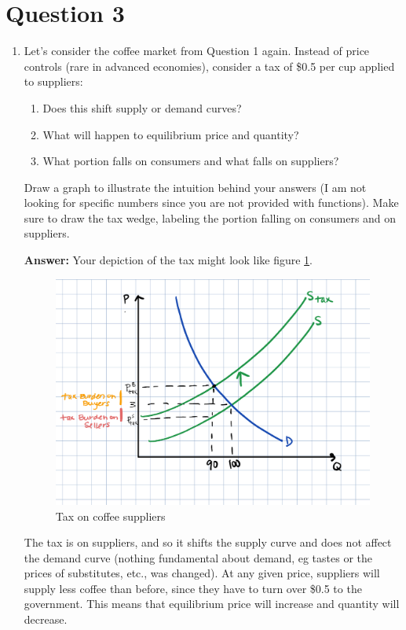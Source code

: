\documentclass[12pt]{article}
\begin{document}
\section*{Question 3}
\begin{enumerate}
\item Let's consider the coffee market from Question 1 again. Instead of price controls (rare in advanced economies), consider a tax of \$0.5 per cup applied to suppliers:

\begin{enumerate}
    \item Does this shift supply or demand curves?
    \item What will happen to equilibrium price and quantity?
    \item What portion falls on consumers and what falls on suppliers?
\end{enumerate}

 Draw a graph to illustrate the intuition behind your answers (I am not looking for specific numbers since you are not provided with functions). Make sure to draw the tax wedge, labeling the portion falling on consumers and on suppliers.

\vspace{2mm}
\textbf{Answer:}
Your depiction of the tax might look like figure \ref{fig:coffee_tax_1}.

\begin{figure}
    \centering
    \includegraphics[width=.6\textwidth]{coffee_tax_1.png}
    \caption{Tax on coffee suppliers}
    \label{fig:coffee_tax_1}
\end{figure}

The tax is on suppliers, and so it shifts the supply curve and does not affect the demand curve (nothing fundamental about demand, eg tastes or the prices of substitutes, etc., was changed). At any given price, suppliers will supply less coffee than before, since they have to turn over \$0.5 to the government. This means that equilibrium price will increase and quantity will decrease.


\end{enumerate}
\end{document}
